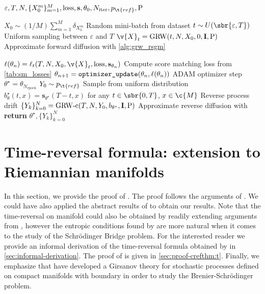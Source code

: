 \begin{algorithm}[!t]
	\caption{\small RSGM-c (Riemannian Score-Based Generative Model with corrector)}
	\label{alg:rsgm-c}
	\begin{algorithmic}[1]
		\small
		\Require $\varepsilon, T, N, \{X_0^m\}_{m=1}^M, \mathrm{loss}, \mathbf{s}, \theta_0, N_{\textrm{iter}}, p_{\t{ref}}, \mathrm{P}$

		\State $X_0 \sim (1/M) \sum_{m=1}^M \delta_{X_0^m}$ \Comment Random mini-batch from dataset
		\State $t \sim U(\sbr{\varepsilon, T})$ \Comment Uniform sampling between $\varepsilon$ and $T$
		\State $\v{X}_t = \textrm{GRW}(t, N, X_0, 0, \m{I}, \mathrm{P})$ \Comment Approximate forward diffusion with \cref{alg:grw_rsgm}

		\State
		$\ell(\theta_n) = \ell_t(T, N, X_0, \v{X}_t, \mathrm{loss}, \mathbf{s}_{\theta_n})$
		\Comment Compute score matching loss from \cref{tab:sm_losses} \State
		$\theta_{n+1} = \verb|optimizer_update|(\theta_n, \ell(\theta_n))$ \Comment ADAM
		optimizer step
		\EndFor \State $\theta^\star = \theta_{N_{\textrm{epoch}}}$
		 \State $Y_0 \sim p_{\t{ref}}$ \Comment
		Sample from uniform distribution \State
		$b_\theta^\star(t, x) = \mathbf{s}_{\theta^\star}(T-t, x)$ for any
		$t \in \sbr{0,T}$, $x \in \c{M}$ \Comment Reverse process drift \State
		$\{Y_k\}_{k=0}^{N} = \textrm{GRW-c}(T, N, Y_0, b_{\theta^\star}, \m{I},
			\mathrm{P})$ \Comment Approximate reverse diffusion with  \State
		{\bfseries return} $\theta^\star, \{Y_k\}_{k=0}^{N}$
	\end{algorithmic}
\end{algorithm}

\section{Time-reversal formula: extension to  Riemannian manifolds}
\label{sec:time-reversal-manifold-proof}

In this section, we provide the proof of .
The proof follows the arguments of \textcite[Theorem 4.9]{cattiaux2021time}.
We could have also applied the abstract results of \textcite[Theorem 5.7]{cattiaux2021time} to obtain our results.
Note that the time-reversal on manifold could also be obtained by readily extending arguments from \textcite{haussmann1986time}, however the entropic conditions found by \textcite{cattiaux2021time} are more natural when it comes to the study of the Schr\"odinger Bridge problem.
For the interested reader we provide an informal derivation of the time-reversal formula obtained by \textcite{haussmann1986time} in \cref{sec:informal-derivation}.
The proof of  is given in \cref{sec:proof-crefthm:t}.
Finally, we emphasize that \textcite{garcia2021brenier} have developed a Girsanov theory for stochastic processes defined on compact manifolds with boundary in order to study the Brenier-Schr\"odinger problem.

